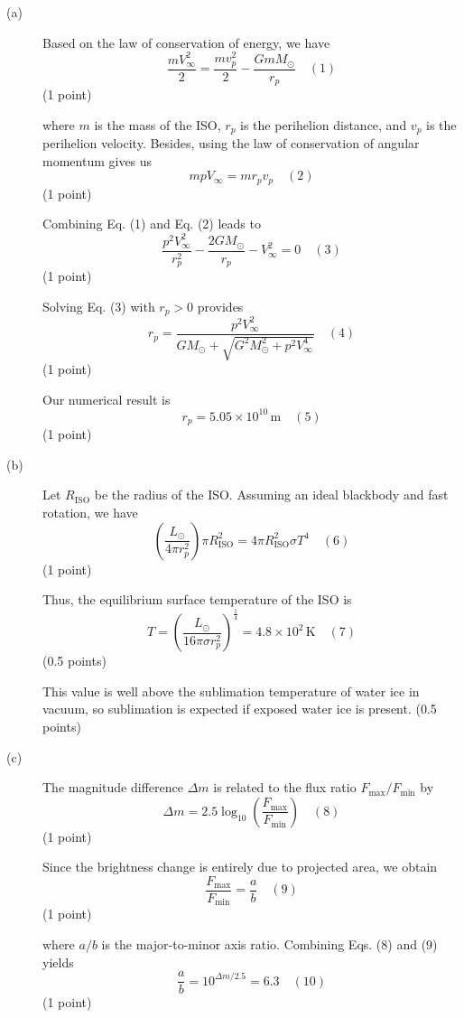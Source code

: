 \begin{description}
\item[(a)] Based on the law of conservation of energy, we have
  \[ \frac{mV_\infty^2}{2} = \frac{mv_p^2}{2} - \frac{GmM_\odot}{r_p}
     \quad (1) \]
  \hfill(1 point)

  where $m$ is the mass of the ISO, $r_p$ is the perihelion distance, and
  $v_p$ is the perihelion velocity. Besides, using the law of conservation of
  angular momentum gives us
  \[ mpV_\infty = mr_p v_p \quad (2) \]
  \hfill(1 point)

  Combining Eq. (1) and Eq. (2) leads to
  \[ \frac{p^2 V_\infty^2}{r_p^2} - \frac{2GM_\odot}{r_p} - V_\infty^2 = 0
     \quad (3) \]
  \hfill(1 point)

  Solving Eq. (3) with $r_p > 0$ provides
  \[ r_p = \frac{p^2 V_\infty^2}
                {GM_\odot + \sqrt{G^2 M_\odot^2 + p^2 V_\infty^4}}
     \quad (4) \]
  \hfill(1 point)

  Our numerical result is
  \[ r_p = 5.05 \times 10^{10}\,\mathrm{m} \quad (5) \]
  \hfill(1 point)

\item[(b)] Let $R_{\mathrm{ISO}}$ be the radius of the ISO. Assuming an ideal
  blackbody and fast rotation, we have
  \[ \left(\frac{L_\odot}{4\pi r_p^2}\right)\pi R_{\mathrm{ISO}}^2
     = 4\pi R_{\mathrm{ISO}}^2 \sigma T^4 \quad (6) \]
  \hfill(1 point)

  Thus, the equilibrium surface temperature of the ISO is
  \[ T = \left(\frac{L_\odot}{16\pi\sigma r_p^2}\right)^{\frac{1}{4}}
       = 4.8 \times 10^2\,\mathrm{K} \quad (7) \]
  \hfill(0.5 points)

  This value is well above the sublimation temperature of water ice in
  vacuum, so sublimation is expected if exposed water ice is present.
  \hfill(0.5 points)

\item[(c)] The magnitude difference $\Delta m$ is related to the flux ratio
  $F_{\mathrm{max}}/F_{\mathrm{min}}$ by
  \[ \Delta m = 2.5\log_{10}\left(\frac{F_{\mathrm{max}}}{F_{\mathrm{min}}}\right)
     \quad (8) \]
  \hfill(1 point)

  Since the brightness change is entirely due to projected area, we obtain
  \[ \frac{F_{\mathrm{max}}}{F_{\mathrm{min}}} = \frac{a}{b} \quad (9) \]
  \hfill(1 point)

  where $a/b$ is the major-to-minor axis ratio. Combining Eqs. (8) and (9)
  yields
  \[ \frac{a}{b} = 10^{\Delta m/2.5} = 6.3 \quad (10) \]
  \hfill(1 point)
\end{description}

